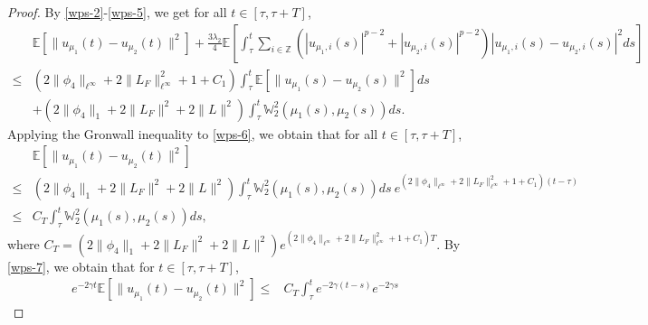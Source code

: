 \documentclass[11pt]{article}
\numberwithin{equation}{section}
\theoremstyle{plain}
\begin{document}
\begin{proof}
 By \eqref{wps-2}-\eqref{wps-5}, we get
 for all $ t \in [\tau, \tau + T]$,
 \begin{align}\label{wps-6}
       & \mathbb{E}
            \left[ \|u_{\mu_1}(t) - u_{\mu_2}(t) \|^2 \right]
            + \frac{3\lambda_2}{4}
              \mathbb{E}
                 \left[ \int_{\tau}^{t} \sum_{i \in \mathbb{Z}}
                           \left( |u_{\mu_1,i}(s)|^{p-2} + |u_{\mu_2,i}(s) |^{p-2} \right)
                                  |u_{\mu_1,i}(s) - u_{\mu_2,i}(s)|^2 ds
                 \right]  \nonumber\\
  \le & \left( 2 \|\phi_4\|_{\ell^\infty}
                + 2 \|L_{F}\|_{\ell^\infty}^2
                + 1
                + C_1
         \right)
         \int_{\tau}^{t}
                  \mathbb{E} \left[ \| u_{\mu_1}(s) - u_{\mu_2}(s) \|^2 \right] ds
                  \nonumber \\
       & + \left( 2 \|\phi_4\|_1
                  + 2 \|L_{F}\|^2
                  + 2 \|L\|^2
           \right)
           \int_{\tau}^{t} \mathbb{W}_2^2(\mu_1(s),\mu_2(s) ) ds.
\end{align}
 Applying the Gronwall inequality to \eqref{wps-6}, we obtain  that for all $ t \in [\tau, \tau + T]$,
 \begin{align}\label{wps-7}
        & \mathbb{E}
             \left[ \|u_{\mu_1}(t) - u_{\mu_2}(t) \|^2 \right]  \nonumber\\
   \le & \left( 2 \|\phi_4\|_1
                  + 2 \|L_{F}\|^2
                  + 2 \|L\|^2
          \right)
          \int_{\tau}^{t} \mathbb{W}_2^2(\mu_1(s),\mu_2(s) ) ds \
           e^{ \left( 2 \|\phi_4\|_{\ell^\infty}
                      + 2 \|L_{F}\|_{\ell^\infty}^2
                      + 1
                      + C_1
                \right) (t-\tau) }  \nonumber \\
   \le & C_T \int_{\tau}^{t}
                 \mathbb{W}^2_2(\mu_1(s), \mu_2(s) ) ds,
 \end{align}
 where
   $ C_T = \left( 2 \|\phi_4\|_1
                  + 2 \|L_{F}\|^2
                  + 2 \|L\|^2
           \right)
            e^{ \left( 2 \|\phi_4\|_{\ell^\infty}
                      + 2 \|L_{F}\|_{\ell^\infty}^2
                      + 1
                      + C_1
                \right) T }$.
 By \eqref{wps-7}, we obtain that for $ t \in [\tau, \tau + T]$,
 \begin{align} \label{wps-8}
        e^{-2 \gamma t}
        \mathbb{E}
           \left[ \|u_{\mu_1}(t) - u_{\mu_2}(t) \|^2 \right]
 \le & C_T \int_{\tau}^{t} e^{-2 \gamma (t - s)} e^{-2 \gamma s}

\end{align}
\end{proof}
\end{document}
